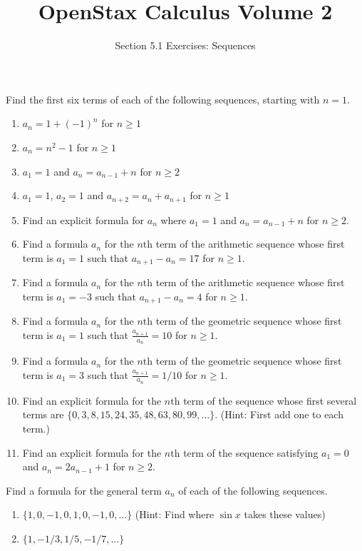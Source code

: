 \documentclass{exercises}
\title{OpenStax Calculus Volume 2}
\subtitle{Section 5.1 Exercises: Sequences}
\author{}
\date{}
\begin{document}
\maketitle


Find the first six terms of each of the following sequences, starting with $n=1$.

\begin{enumerate}[start=1]
\item $a_{n}=1+{(-1)}^{n}$ for $n\ge1$
\item $a_{n}=n^{2}-1$ for $n\ge1$
\item $a_{1}=1$ and $a_{n}=a_{n-1}+n$ for $n\ge2$
\item $a_{1}=1$, $a_{2}=1$ and $a_{n+2}=a_{n}+a_{n+1}$ for $n\ge1$
\item Find an explicit formula for $a_{n}$ where $a_{1}=1$ and $a_{n}=a_{n-1}+n$ for $n\ge2$.
\item Find a formula $a_{n}$ for the $n\text{th}$ term of the arithmetic sequence whose first term is $a_{1}=1$ such that $a_{n+1}-a_{n}=17$ for $n\ge1$.
\item Find a formula $a_{n}$ for the $n\text{th}$ term of the arithmetic sequence whose first term is $a_{1}=-3$ such that $a_{n+1}-a_{n}=4$ for $n\ge1$.
\item Find a formula $a_{n}$ for the $n\text{th}$ term of the geometric sequence whose first term is $a_{1}=1$ such that $\frac{a_{n+1}}{a_{n}}=10$ for $n\ge1$.
\item Find a formula $a_{n}$ for the $n\text{th}$ term of the geometric sequence whose first term is $a_{1}=3$ such that $\frac{a_{n+1}}{a_{n}}=1/10$ for $n\ge1$.
\item Find an explicit formula for the $n\text{th}$ term of the sequence whose first several terms are $\{0,3,8,15,24,35,48,63,80,99,\ldots \}$. (Hint: First add one to each term.)
\item Find an explicit formula for the $n\text{th}$ term of the sequence satisfying $a_{1}=0$ and $a_{n}=2a_{n-1}+1$ for $n\ge2$.
\end{enumerate}

Find a formula for the general term $a_{n}$ of each of the following sequences.

\begin{enumerate}[resume]
\item $\{1,0,-1,0,1,0,-1,0,\ldots \}$ (Hint: Find where $\sin x$ takes these values)
\item $\{1,-1/3,1/5,-1/7,\ldots \}$
\end{enumerate}
\end{document}
